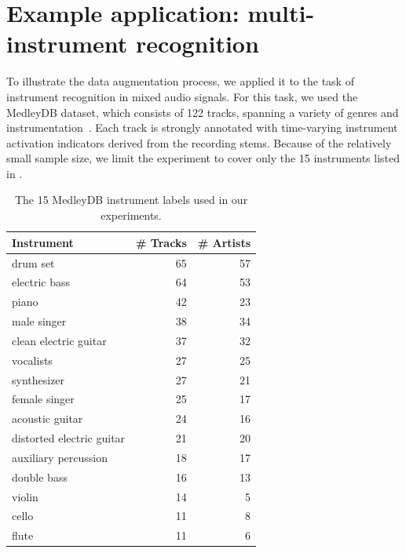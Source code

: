 \documentclass{article}
\begin{document}
\section{Example application: multi-instrument recognition}

To illustrate the data augmentation process, we applied it to the task of instrument
recognition in mixed audio signals.  For this task, we used the MedleyDB dataset, which
consists of 122 tracks, spanning a variety of genres and
instrumentation~\cite{bittner2014medleydb}.  Each track is strongly annotated with 
time-varying instrument activation indicators derived from the recording stems.
Because of the relatively small sample size, we limit the experiment to cover only 
the 15 instruments listed in .

\begin{table}
\caption{The 15 MedleyDB instrument labels used in our experiments.\label{medleytags}}
\centering
\small
    \begin{tabular}{lrr}
        \toprule
        Instrument & \# Tracks & \# Artists\\
        \midrule
        drum set                    & 65 & 57\\
        electric bass               & 64 & 53\\
        piano                       & 42 & 23\\
        male singer                 & 38 & 34\\
        clean electric guitar       & 37 & 32\\
        vocalists                   & 27 & 25\\
        synthesizer                 & 27 & 21\\
        female singer               & 25 & 17\\
        acoustic guitar             & 24 & 16\\
        distorted electric guitar   & 21 & 20 \\
        auxiliary percussion        & 18 & 17\\
        double bass                 & 16 & 13\\
        violin                      & 14 & 5\\
        cello                       & 11 & 8\\
        flute                       & 11 & 6\\
        \bottomrule
    \end{tabular}
\end{table}
\end{document}

